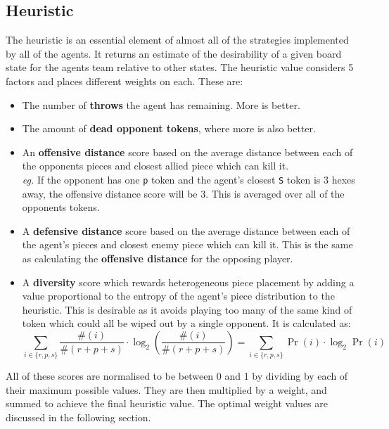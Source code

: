 \documentclass{article}
\begin{document}
\subsection{Heuristic}
\label{sec: Heuristic}
The heuristic is an essential element of almost all of the strategies implemented by all of the agents. It returns an estimate of the desirability of a given board state for the agents team relative to other states. The heuristic value considers 5 factors and places different weights on each. These are:
\begin{itemize}
    \item The number of \textbf{throws} the agent has remaining. More is better.
    \item The amount of \textbf{dead opponent tokens}, where more is also better.
    \item An \textbf{offensive distance} score based on the average distance between each of the opponents pieces and closest allied piece which can kill it.\\[2mm]
    \textit{eg.} If the opponent has one \verb|p| token and the agent's closest \verb|S| token is 3 hexes away, the offensive distance score will be 3. This is averaged over all of the opponents tokens.
    \item A \textbf{defensive distance} score based on the average distance between each of the agent's pieces and closest enemy piece which can kill it. This is the same as calculating the \textbf{offensive distance} for the opposing player.
    \item A \textbf{diversity} score which rewards heterogeneous piece placement by adding a value proportional to the entropy of the agent's piece distribution to the heuristic. This is desirable as it avoids playing too many of the same kind of token which could all be wiped out by a single opponent. It is calculated as: $$\sum_{i\in\{r,p,s\}} \frac{\#(i)}{\#(r+p+s)} \cdot \log_2 \left( \frac{\#(i)}{\#(r+p+s)} \right) = \sum_{i\in\{r,p,s\}} \Pr(i) \cdot \log_2 \Pr(i)$$
\end{itemize}
All of these scores are normalised to be between 0 and 1 by dividing by each of their maximum possible values. They are then multiplied by a weight, and summed to achieve the final heuristic value. The optimal weight values are discussed in the following section.
\end{document}
